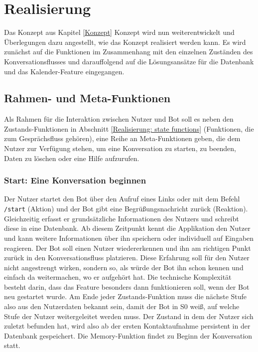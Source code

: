 \chapter{Realisierung} \label{Realisierung}

    Das Konzept aus Kapitel \ref*{Konzept} Konzept wird nun weiterentwickelt und Überlegungen dazu angestellt, wie das Konzept realisiert werden kann. Es wird zunächst auf die Funktionen im Zusammenhang mit den einzelnen Zuständen des Konversationsflusses und darauffolgend auf die Lösungsansätze für die Datenbank und das Kalender-Feature eingegangen.

    
    \section{Rahmen- und Meta-Funktionen} \label{Realisierung: meta functions}
        Als Rahmen für die Interaktion zwischen Nutzer und Bot soll es neben den Zustands-Funktionen in Abschnitt \ref*{Realisierung: state functions} (Funktionen, die zum Gesprächsfluss gehören), eine Reihe an Meta-Funktionen geben, die dem Nutzer zur Verfügung stehen, um eine Konversation zu starten, zu beenden, Daten zu löschen oder eine Hilfe aufzurufen.
            
        \subsection{Start: Eine Konversation beginnen}
            Der Nutzer startet den Bot über den Aufruf eines Links oder mit dem Befehl \verb|/start| (Aktion) und der Bot gibt eine Begrüßungsnachricht zurück (Reaktion). Gleichzeitig erfasst er grundsätzliche Informationen des Nutzers und schreibt diese in eine Datenbank. Ab diesem Zeitpunkt kennt die Applikation den Nutzer und kann weitere Informationen über ihn speichern oder individuell auf Eingaben reagieren. Der Bot soll einen Nutzer wiedererkennen und ihn am richtigen Punkt zurück in den Konversationsfluss platzieren. Diese Erfahrung soll für den Nutzer nicht angestrengt wirken, sondern so, als würde der Bot ihn schon kennen und einfach da weitermachen, wo er aufgehört hat. Die technische Komplexität besteht darin, dass das Feature besonders dann funktionieren soll, wenn der Bot neu gestartet wurde. Am Ende jeder Zustands-Funktion muss die nächste Stufe also aus den Nutzerdaten bekannt sein, damit der Bot in S0 weiß, auf welche Stufe der Nutzer weitergeleitet werden muss. Der Zustand in dem der Nutzer sich zuletzt befunden hat, wird also ab der ersten Kontaktaufnahme persistent in der Datenbank gespeichert. Die Memory-Funktion findet zu Beginn der Konversation statt. 
        
